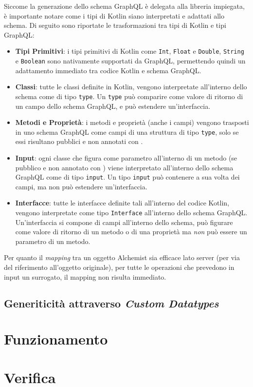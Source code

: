 Siccome la generazione dello schema GraphQL è delegata alla libreria impiegata, è importante notare come i tipi di Kotlin siano interpretati e adattati
allo schema. Di seguito sono riportate le trasformazioni tra tipi di Kotlin e tipi GraphQL:
\begin{itemize}
    \item \textbf{Tipi Primitivi}: i tipi primitivi di Kotlin come \texttt{Int}, \texttt{Float} e \texttt{Double}, \texttt{String} e \texttt{Boolean}
        sono nativamente supportati da GraphQL, permettendo quindi un adattamento immediato tra codice Kotlin e schema GraphQL.
    \item \textbf{Classi}: tutte le classi definite in Kotlin, vengono interpretate all'interno dello schema come di tipo \texttt{type}. Un \texttt{type}
        può comparire come valore di ritorno di un campo dello schema GraphQL, e può estendere un'interfaccia.
    \item \textbf{Metodi e Proprietà}: i metodi e proprietà (anche i campi) vengono trasposti in uno schema GraphQL come campi di una struttura di tipo
        \texttt{type}, solo se essi risultano pubblici e non annotati con .
    \item \textbf{Input}: ogni classe che figura come parametro all'interno di un metodo (se pubblico e non annotato con ) viene
        interpretato all'interno dello schema GraphQL come di tipo \texttt{input}. Un tipo \texttt{input} può contenere a sua volta dei campi,
        ma non può estendere un'interfaccia.
    \item \textbf{Interfacce}: tutte le interfacce definite tali all'interno del codice Kotlin, vengono interpretate come tipo \texttt{Interface} all'interno
        dello schema GraphQL. Un'interfaccia si compone di campi all'interno dello schema, può figurare come valore di ritorno di un metodo o di una proprietà
        ma \textit{non} può essere un parametro di un metodo.
\end{itemize}




Per quanto il \textit{mapping} tra un oggetto Alchemist sia efficace lato server (per via del riferimento all'oggetto originale), per tutte le operazioni
che prevedono in input un surrogato, il mapping non risulta immediato.

\subsection{Generiticità attraverso \textit{Custom Datatypes}}\label{ssec:custom-dtypes}

\section{Funzionamento}\label{sec:functioning}

\section{Verifica}\label{sec:testing}

